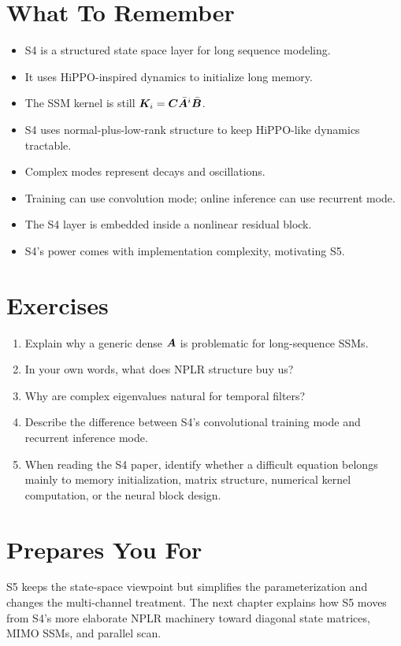 \section{What To Remember}

\begin{itemize}
  \item S4 is a structured state space layer for long sequence modeling.
  \item It uses HiPPO-inspired dynamics to initialize long memory.
  \item The SSM kernel is still $\bm{K}_i=\bm{C}\bar{\bm{A}}^i\bar{\bm{B}}$.
  \item S4 uses normal-plus-low-rank structure to keep HiPPO-like dynamics tractable.
  \item Complex modes represent decays and oscillations.
  \item Training can use convolution mode; online inference can use recurrent mode.
  \item The S4 layer is embedded inside a nonlinear residual block.
  \item S4's power comes with implementation complexity, motivating S5.
\end{itemize}

\section{Exercises}

\begin{enumerate}
  \item Explain why a generic dense $\bm{A}$ is problematic for long-sequence SSMs.
  \item In your own words, what does NPLR structure buy us?
  \item Why are complex eigenvalues natural for temporal filters?
  \item Describe the difference between S4's convolutional training mode and recurrent
  inference mode.
  \item When reading the S4 paper, identify whether a difficult equation belongs mainly
  to memory initialization, matrix structure, numerical kernel computation, or the neural
  block design.
\end{enumerate}

\section{Prepares You For}

S5 keeps the state-space viewpoint but simplifies the parameterization and changes the
multi-channel treatment. The next chapter explains how S5 moves from S4's more elaborate
NPLR machinery toward diagonal state matrices, MIMO SSMs, and parallel scan.
